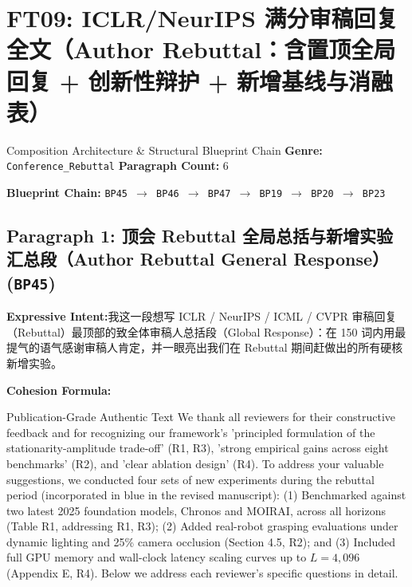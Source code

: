 \section{FT09: ICLR/NeurIPS 满分审稿回复全文（Author Rebuttal：含置顶全局回复 + 创新性辩护 + 新增基线与消融表）}\label{comp:FT09}
\begin{ConceptBox}{Composition Architecture \& Structural Blueprint Chain}
\textbf{Genre:} \texttt{Conference\_Rebuttal} \quad \textbf{Paragraph Count:} 6\par
\textbf{Blueprint Chain:} \texttt{BP45 $\to$ BP46 $\to$ BP47 $\to$ BP19 $\to$ BP20 $\to$ BP23}
\end{ConceptBox}
\subsection*{Paragraph 1: 顶会 Rebuttal 全局总括与新增实验汇总段（Author Rebuttal General Response） (\texttt{BP45})}
\noindent\textbf{Expressive Intent:}\enspace 我这一段想写 ICLR / NeurIPS / ICML / CVPR 审稿回复（Rebuttal）最顶部的致全体审稿人总括段（Global Response）：在 150 词内用最提气的语气感谢审稿人肯定，并一眼亮出我们在 Rebuttal 期间赶做出的所有硬核新增实验。\par
\noindent\textbf{Cohesion Formula:}\par\vspace{4pt}
\begin{ExampleBox}{Publication-Grade Authentic Text}
We thank all reviewers for their constructive feedback and for recognizing our framework's 'principled formulation of the stationarity-amplitude trade-off' (R1, R3), 'strong empirical gains across eight benchmarks' (R2), and 'clear ablation design' (R4). To address your valuable suggestions, we conducted four sets of new experiments during the rebuttal period (incorporated in blue in the revised manuscript): (1) Benchmarked against two latest 2025 foundation models, Chronos and MOIRAI, across all horizons (Table R1, addressing R1, R3); (2) Added real-robot grasping evaluations under dynamic lighting and 25\% camera occlusion (Section 4.5, R2); and (3) Included full GPU memory and wall-clock latency scaling curves up to $L=4,096$ (Appendix E, R4). Below we address each reviewer's specific questions in detail.
\end{ExampleBox}
